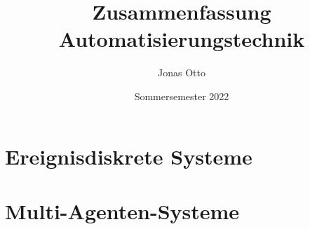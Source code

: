 \documentclass[a4paper]{book}
\title{Zusammenfassung Automatisierungstechnik}
\author{Jonas Otto}
\date{Sommersemester 2022}
\begin{document}
\maketitle
\tableofcontents

\pagebreak
\chapter{Ereignisdiskrete Systeme}


\pagebreak
\chapter{Multi-Agenten-Systeme}

\end{document}
